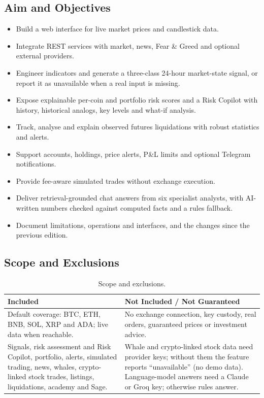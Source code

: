 \subsection{Aim and Objectives}
\begin{itemize}
\item Build a web interface for live market prices and candlestick data.
\item Integrate REST services with market, news, Fear \& Greed and optional external providers.
\item Engineer indicators and generate a three-class 24-hour market-state signal, or report it as unavailable when a real input is missing.
\item Expose explainable per-coin and portfolio risk scores and a Risk Copilot with history, historical analogs, key levels and what-if analysis.
\item Track, analyse and explain observed futures liquidations with robust statistics and alerts.
\item Support accounts, holdings, price alerts, P\&L limits and optional Telegram notifications.
\item Provide fee-aware simulated trades without exchange execution.
\item Deliver retrieval-grounded chat answers from six specialist analysts, with AI-written numbers checked against computed facts and a rules fallback.
\item Document limitations, operations and interfaces, and the changes since the previous edition.
\end{itemize}

\subsection{Scope and Exclusions}
\begin{table}[H]\centering
\renewcommand{\arraystretch}{1.3}
\begin{tabularx}{\linewidth}{|X|X|}\hline
\textbf{Included} & \textbf{Not Included / Not Guaranteed}\\\hline
Default coverage: BTC, ETH, BNB, SOL, XRP and ADA; live data when reachable. & No exchange connection, key custody, real orders, guaranteed prices or investment advice.\\\hline
Signals, risk assessment and Risk Copilot, portfolio, alerts, simulated trading, news, whales, crypto-linked stock trades, listings, liquidations, academy and Sage. & Whale and crypto-linked stock data need provider keys; without them the feature reports ``unavailable'' (no demo data). Language-model answers need a Claude or Groq key; otherwise rules answer.\\\hline
\end{tabularx}
\caption{Scope and exclusions.}\label{tab:scope}
\end{table}

